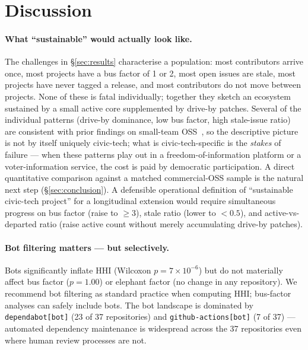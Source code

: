 \documentclass[a4paper,UKenglish,cleveref,autoref,thm-restate]{lipics-v2021}
\begin{document}
\section{Discussion}\label{sec:discussion}

\paragraph{What ``sustainable'' would actually look like.}
The challenges in \S\ref{sec:results} characterise a population: most contributors arrive once, most projects have a bus factor of 1 or 2, most open issues are stale, most projects have never tagged a release, and most contributors do not move between projects. None of these is fatal individually; together they sketch an ecosystem sustained by a small active core supplemented by drive-by patches. Several of the individual patterns (drive-by dominance, low bus factor, high stale-issue ratio) are consistent with prior findings on small-team OSS~\cite{Pinto2016,Avelino2016,Coelho2017}, so the descriptive picture is not by itself uniquely civic-tech; what is civic-tech-specific is the \emph{stakes} of failure --- when these patterns play out in a freedom-of-information platform or a voter-information service, the cost is paid by democratic participation. A direct quantitative comparison against a matched commercial-OSS sample is the natural next step (\S\ref{sec:conclusion}). A defensible operational definition of ``sustainable civic-tech project'' for a longitudinal extension would require simultaneous progress on bus factor (raise to $\geq 3$), stale ratio (lower to $< 0.5$), and active-vs-departed ratio (raise active count without merely accumulating drive-by patches).

\paragraph{Bot filtering matters --- but selectively.}
Bots significantly inflate HHI (Wilcoxon $p = 7 \times 10^{-6}$) but do not materially affect bus factor ($p = 1.00$) or elephant factor (no change in any repository). We recommend bot filtering as standard practice when computing HHI; bus-factor analyses can safely include bots. The bot landscape is dominated by \texttt{dependabot[bot]} (23 of 37 repositories) and \texttt{github-actions[bot]} (7 of 37) --- automated dependency maintenance is widespread across the 37 repositories even where human review processes are not.
\end{document}
